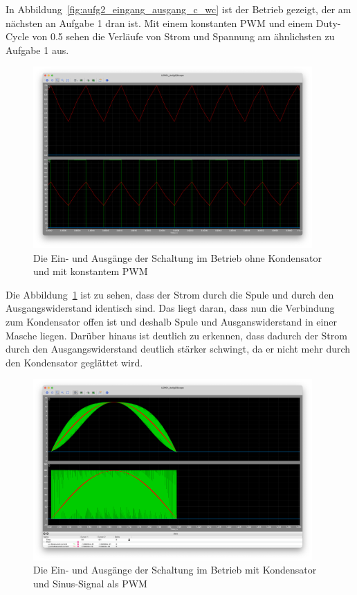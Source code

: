 \documentclass{report}
\begin{document}
In Abbildung~\ref{fig:aufg2_eingang_ausgang_c_wc} ist der Betrieb gezeigt, der am nächsten an Aufgabe 1 dran ist. Mit einem konstanten PWM und einem Duty-Cycle von 0.5 sehen die Verläufe von Strom und Spannung am ähnlichsten zu Aufgabe 1 aus.

\begin{figure}[hbt!]
	\begin{center}
		\includegraphics[width=0.95\textwidth]{assets/img/aufg2_eingang_ausgang_c_nc.png}
	\end{center}
	\caption{Die Ein- und Ausgänge der Schaltung im Betrieb ohne Kondensator und mit konstantem PWM}
	\label{fig:aufg2_eingang_ausgang_c_nc}
\end{figure}

Die Abbildung~\ref{fig:aufg2_eingang_ausgang_c_nc} ist zu sehen, dass der Strom durch die Spule und durch den Ausgangswiderstand identisch sind. Das liegt daran, dass nun die Verbindung zum Kondensator offen ist und deshalb Spule und Ausganswiderstand in einer Masche liegen. Darüber hinaus ist deutlich zu erkennen, dass dadurch der Strom durch den Ausgangswiderstand deutlich stärker schwingt, da er nicht mehr durch den Kondensator geglättet wird.

\begin{figure}[hbt!]
	\begin{center}
		\includegraphics[width=0.95\textwidth]{assets/img/aufg2_eingang_ausgang_sin_wc.png}
	\end{center}
	\caption{Die Ein- und Ausgänge der Schaltung im Betrieb mit Kondensator und Sinus-Signal als PWM}
	\label{fig:aufg2_eingang_ausgang_sin_wc}
\end{figure}
\end{document}
